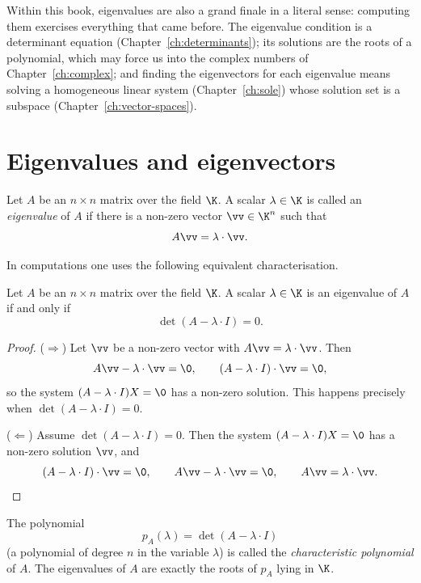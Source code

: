 Within this book, eigenvalues are also a grand finale in a literal sense: computing them exercises
everything that came before. The eigenvalue condition is a determinant equation
(Chapter~\ref{ch:determinants}); its solutions are the roots of a polynomial, which may force us into the
complex numbers of Chapter~\ref{ch:complex}; and finding the eigenvectors for each eigenvalue means
solving a homogeneous linear system (Chapter~\ref{ch:sole}) whose solution set is a subspace
(Chapter~\ref{ch:vector-spaces}).

\section{Eigenvalues and eigenvectors}

\begin{definition}
Let $A$ be an $n\times n$ matrix over the field $\K$. A scalar $\lambda\in \K$ is called an \emph{eigenvalue}
of $A$ if there is a non-zero vector $\vv\in \K^n$ such that
\[
A\vv= \lambda \cdot \vv.
\]
\end{definition}

In computations one uses the following equivalent characterisation.

\begin{theorem}
Let $A$ be an $n\times n$ matrix over the field $\K$. A scalar $\lambda\in \K$ is an eigenvalue of $A$ if
and only if
\[
\det(A-\lambda \cdot I) = 0.
\]
\end{theorem}

\begin{proof}
($\Rightarrow$) Let $\vv$ be a non-zero vector with $A\vv = \lambda\cdot \vv$. Then
\[
A\vv - \lambda\cdot \vv = \0, \qquad (A - \lambda \cdot I)\cdot \vv = \0,
\]
so the system $(A - \lambda \cdot I)X = \0$ has a non-zero solution. This happens precisely when
$\det(A - \lambda \cdot I)=0$.

($\Leftarrow$) Assume $\det(A - \lambda \cdot I)=0$. Then the system $(A - \lambda \cdot I)X = \0$ has a
non-zero solution $\vv$, and
\[
(A - \lambda \cdot I)\cdot \vv = \0, \qquad A\vv - \lambda\cdot \vv = \0, \qquad A\vv = \lambda\cdot \vv. \qedhere
\]
\end{proof}

\begin{definition}
The polynomial
\[
p_A(\lambda) = \det(A-\lambda\cdot I)
\]
(a polynomial of degree $n$ in the variable $\lambda$) is called the \emph{characteristic polynomial} of
$A$. The eigenvalues of $A$ are exactly the roots of $p_A$ lying in $\K$.
\end{definition}

